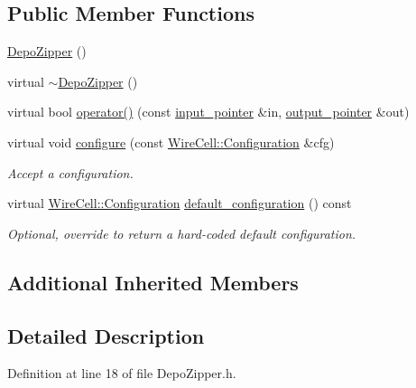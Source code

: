 \subsection*{Public Member Functions}
\begin{DoxyCompactItemize}
\item 
\hyperlink{class_wire_cell_1_1_gen_1_1_depo_zipper_a979b5a7e363cacce9abc4b916b364adc}{Depo\+Zipper} ()
\item 
virtual \hyperlink{class_wire_cell_1_1_gen_1_1_depo_zipper_a3a8f647c7d9d8693f68654d1363346eb}{$\sim$\+Depo\+Zipper} ()
\item 
virtual bool \hyperlink{class_wire_cell_1_1_gen_1_1_depo_zipper_af883a6a654a4a374d17f4db84d268510}{operator()} (const \hyperlink{class_wire_cell_1_1_i_function_node_a55c0946156df9b712b8ad1a0b59b2db6}{input\+\_\+pointer} \&in, \hyperlink{class_wire_cell_1_1_i_function_node_afc02f1ec60d31aacddf64963f9ca650b}{output\+\_\+pointer} \&out)
\item 
virtual void \hyperlink{class_wire_cell_1_1_gen_1_1_depo_zipper_a713d481fc90a63464441068c2abb62b1}{configure} (const \hyperlink{namespace_wire_cell_a9f705541fc1d46c608b3d32c182333ee}{Wire\+Cell\+::\+Configuration} \&cfg)
\begin{DoxyCompactList}\small\item\em Accept a configuration. \end{DoxyCompactList}\item 
virtual \hyperlink{namespace_wire_cell_a9f705541fc1d46c608b3d32c182333ee}{Wire\+Cell\+::\+Configuration} \hyperlink{class_wire_cell_1_1_gen_1_1_depo_zipper_aaecdc02da3fb1362266b4606cfe9e03f}{default\+\_\+configuration} () const
\begin{DoxyCompactList}\small\item\em Optional, override to return a hard-\/coded default configuration. \end{DoxyCompactList}\end{DoxyCompactItemize}
\subsection*{Additional Inherited Members}


\subsection{Detailed Description}


Definition at line 18 of file Depo\+Zipper.\+h.




